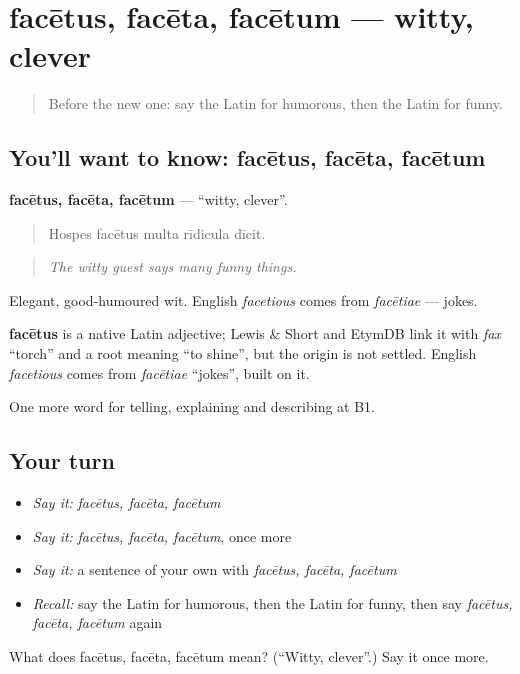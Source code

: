\section[facētus, facēta, facētum]{facētus, facēta, facētum — witty, clever}

\label{lesson:LA-C502-facetus}



\begin{quote}
Before the new one: say the Latin for humorous, then the Latin for funny.
\end{quote}

\subsection*{You'll want to know: facētus, facēta, facētum}
\textbf{facētus, facēta, facētum} — \textquotedblleft{}witty, clever\textquotedblright{}.

\begin{quote}
Hospes facētus multa rīdicula dīcit.
\end{quote}

\begin{quote}
\emph{The witty guest says many funny things.}
\end{quote}

Elegant, good-humoured wit. English \emph{facetious} comes from \emph{facētiae} — jokes.

\begin{cousinweb}
\textbf{facētus} is a native Latin adjective; Lewis \& Short and EtymDB link it with \emph{fax} \textquotedblleft{}torch\textquotedblright{} and a root meaning \textquotedblleft{}to shine\textquotedblright{}, but the origin is not settled. English \emph{facetious} comes from \emph{facētiae} \textquotedblleft{}jokes\textquotedblright{}, built on it.
\end{cousinweb}

\begin{grammarlens}[title={What you've built}]
One more word for telling, explaining and describing at B1.
\end{grammarlens}

\subsection*{Your turn}
\begin{itemize}
\raggedright
  \item \emph{Say it:} \emph{facētus, facēta, facētum}
  \item \emph{Say it:} \emph{facētus, facēta, facētum}, once more
  \item \emph{Say it:} a sentence of your own with \emph{facētus, facēta, facētum}
  \item \emph{Recall:} say the Latin for humorous, then the Latin for funny, then say \emph{facētus, facēta, facētum} again
\end{itemize}

\begin{tcolorbox}[breakable,colback=teal!4,colframe=teal!35!black,title={Before you move on}]
What does facētus, facēta, facētum mean? (\textquotedblleft{}Witty, clever\textquotedblright{}.) Say it once more.
\end{tcolorbox}
